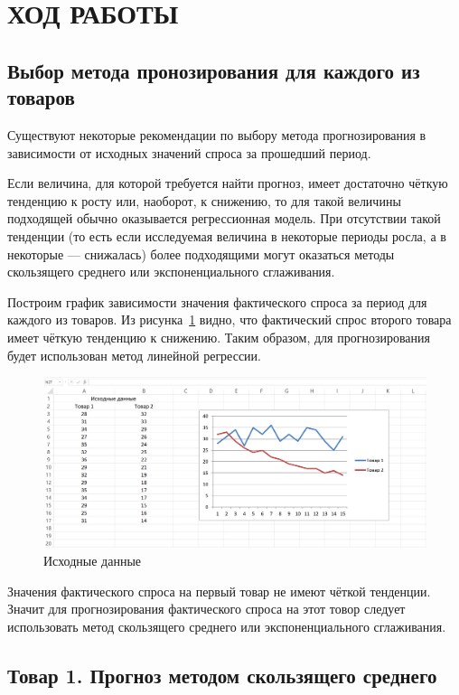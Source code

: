 \section{ХОД РАБОТЫ}

\subsection{Выбор метода пронозирования для каждого из товаров}

Существуют некоторые рекомендации по выбору метода прогнозирования в 
зависимости от исходных значений спроса за прошедший период.

Если величина, для которой требуется найти прогноз, имеет достаточно
чёткую тенденцию к росту или, наоборот, к снижению, то для такой величины
подходящей обычно оказывается регрессионная модель. При отсутствии такой
тенденции (то есть если исследуемая величина в некоторые периоды росла,
а в некоторые --- снижалась) более подходящими могут оказаться методы
скользящего среднего или экспоненциального сглаживания.

Построим график зависимости значения фактического спроса за период
для каждого из товаров. Из рисунка~\ref{fig:initial} видно, что
фактический спрос второго товара имеет чёткую тенденцию к снижению.
Таким образом, для прогнозирования будет использован метод линейной регрессии.

\begin{figure}[h!]
  \centering
  \includegraphics[width=150mm]{pic/initial}
  \caption{Исходные данные}
  \label{fig:initial}
\end{figure}

Значения фактического спроса на первый товар не имеют чёткой тенденции.
Значит для прогнозирования фактического спроса на этот товор следует
использовать метод скользящего среднего или экспоненциального сглаживания.


\subsection{Товар 1. Прогноз методом скользящего среднего}

